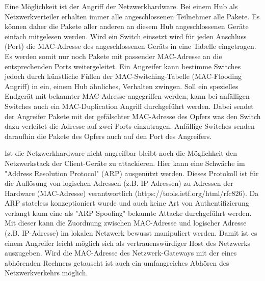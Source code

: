 Eine Möglichkeit ist der Angriff der Netzwerkhardware. Bei einem Hub als Netzwerkverteiler erhalten immer alle angeschlossenen Teilnehmer alle Pakete. Es können daher die Pakete aller anderen an diesem Hub angeschlossenen Geräte einfach mitgelesen werden. Wird ein Switch einsetzt wird für jeden Anschluss (Port) die MAC-Adresse des angeschlossenen Geräts in eine Tabelle eingetragen. Es werden somit nur noch Pakete mit passender MAC-Adresse an die entsprechenden Ports weitergeleitet. Ein Angreifer kann bestimme Switches jedoch durch künstliche Füllen der MAC-Switching-Tabelle (MAC-Flooding Angriff) in ein, einem Hub ähnliches, Verhalten zwingen. Soll ein spezielles Endgerät mit bekannter MAC-Adresse angegriffen werden, kann bei anfälligen Switches auch ein MAC-Duplication Angriff durchgeführt werden. Dabei sendet der Angreifer Pakete mit der gefälschter MAC-Adresse des Opfers was den Switch dazu verleitet die Adresse auf zwei Ports einzutragen. Anfällige Switches senden daraufhin die Pakete des Opfers auch auf den Port des Angreifers.

Ist die Netzwerkhardware nicht angreifbar bleibt noch die Möglichkeit den Netzwerkstack der Client-Geräte zu attackieren. Hier kann eine Schwäche im "Address Resolution Protocol" (ARP) ausgenützt werden. Dieses Protokoll ist für die Auflösung von logischen Adressen (z.B. IP-Adressen) zu Adressen der Hardware (MAC-Adresse) verantwortlich (https://tools.ietf.org/html/rfc826). Da ARP stateless konzeptioniert wurde und auch keine Art von Authentifizierung verlangt kann eine als "ARP Spoofing" bekannte Attacke durchgeführt werden. Mit dieser kann die Zuordnung zwischen MAC-Adresse und logischer Adresse (z.B. IP-Adresse) im lokalen Netzwerk bewusst manipuliert werden. Damit ist es einem Angreifer leicht möglich sich als vertrauenswürdiger Host des Netzwerks auszugeben. Wird die MAC-Adresse des Netzwerk-Gateways mit der eines abhörenden Rechners getauscht ist auch ein umfangreiches Abhören des Netzwerkverkehrs möglich.


